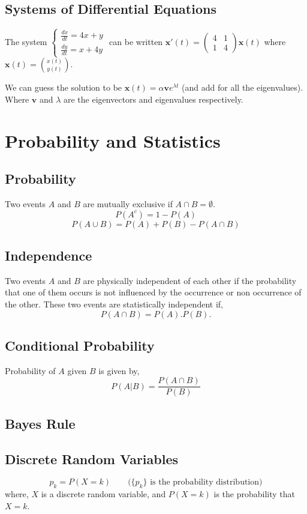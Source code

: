 \documentclass[a4paper,10pt]{article}
\begin{document}
\subsection*{Systems of Differential Equations}
The system 
$\begin{cases}
	\frac{dx}{dt} = 4x + y\\
	\frac{dy}{dt} = x + 4y
\end{cases}$
 can be written $\mathbf{x}'(t) = \begin{pmatrix} 4 & 1\\1 & 4\end{pmatrix}\mathbf{x}(t)$ where $\mathbf{x}(t) = \binom{x(t)}{y(t)}.$
 
We can guess the solution to be $\mathbf{x}(t) = \alpha \mathbf{v} e^{\lambda t}$ (and add for all the eigenvalues). Where $\mathbf{v} $ and $ \lambda$ are the eigenvectors and eigenvalues respectively.

\section*{Probability and Statistics}

\subsection*{Probability}
Two events $A$ and $B$ are mutually exclusive if $A \cap B = \emptyset$.
$$P(A^c) = 1 - P(A)$$
$$P(A \cup B) = P(A) + P(B) - P(A \cap B)$$

\subsection*{Independence}
Two events $A$ and $B$ are physically independent of each other if the probability that one of them occurs is not influenced by the occurrence or non occurrence of the other. These two events are statistically independent if, $$P(A \cap B) = P(A).P(B).$$

\subsection*{Conditional Probability}
Probability of $A$ given $B$ is given by,
$$P(A|B) = \frac{P(A \cap B)}{P(B)}$$

\subsection*{Bayes Rule}

\subsection*{Discrete Random Variables}
$$p_k = P(X=k) \qquad \mbox{(} \{p_k\}\mbox{ is the probability distribution)}$$
where, $X$ is a discrete random variable, and $P(X=k)$ is the probability that $X=k$.\\
\end{document}
